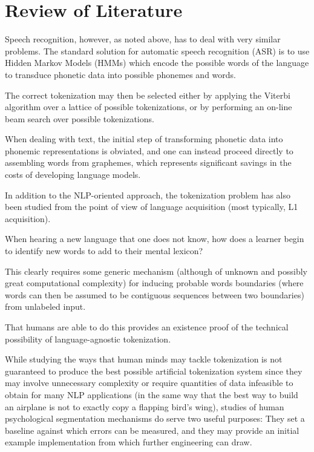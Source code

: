 \chapter{Review of Literature}

Speech recognition, however, as noted above, has to deal with very similar problems. The standard solution for automatic speech recognition (ASR) is to use Hidden Markov Models (HMMs) which encode the possible words of the language to transduce phonetic data into possible phonemes and words\cite{varile97}.

The correct tokenization may then be selected either by applying the Viterbi algorithm over a lattice of possible tokenizations\cite{aubert94}, or by performing an on-line beam search over possible tokenizations\cite{paul94}.


When dealing with text, the initial step of transforming phonetic data into phonemic representations is obviated, and one can instead proceed directly to assembling words from graphemes, which represents significant savings in the costs of developing language models.

In addition to the NLP-oriented approach, the tokenization problem has also been studied from the point of view of language acquisition (most typically, L1 acquisition).

When hearing a new language that one does not know, how does a learner begin to identify new words to add to their mental lexicon?

This clearly requires some generic mechanism (although of unknown and possibly great computational complexity) for inducing probable words boundaries (where words can then be assumed to be contiguous sequences between two boundaries) from unlabeled input.

That humans are able to do this provides an existence proof of the technical possibility of language-agnostic tokenization.

While studying the ways that human minds may tackle tokenization is not guaranteed to produce the best possible artificial tokenization system since they may involve unnecessary complexity or require quantities of data infeasible to obtain for many NLP applications (in the same way that the best way to build an airplane is not to exactly copy a flapping bird's wing), studies of human psychological segmentation mechanisms do serve two useful purposes: They set a baseline against which errors can be measured, and they may provide an initial example implementation from which further engineering can draw\cite{daland09}.

